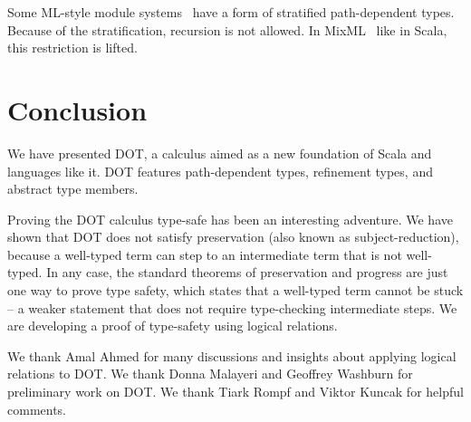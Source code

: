 \documentclass[9pt]{sigplanconf}
\begin{document}
Some ML-style module systems~\cite{homl,mixinml} have a form of
stratified path-dependent types. Because of the stratification,
recursion is not allowed. In MixML~\cite{mixml} like in Scala, this
restriction is lifted.

\section{Conclusion}\label{conclusion}

We have presented DOT, a calculus aimed as a new foundation of Scala
and languages like it. DOT features path-dependent types, refinement
types, and abstract type members.

Proving the DOT calculus type-safe has been an interesting
adventure. We have shown that DOT does not satisfy preservation (also
known as subject-reduction), because a well-typed term can step to an
intermediate term that is not well-typed. In any case, the standard
theorems of preservation and progress are just one way to prove type
safety, which states that a well-typed term cannot be stuck -- a
weaker statement that does not require type-checking intermediate
steps. We are developing a proof of type-safety using logical
relations.

%


\acks

We thank Amal Ahmed for many discussions and insights about applying
logical relations to DOT. We thank Donna Malayeri and Geoffrey
Washburn for preliminary work on DOT. We thank Tiark Rompf and Viktor
Kuncak for helpful comments.



\end{document}
